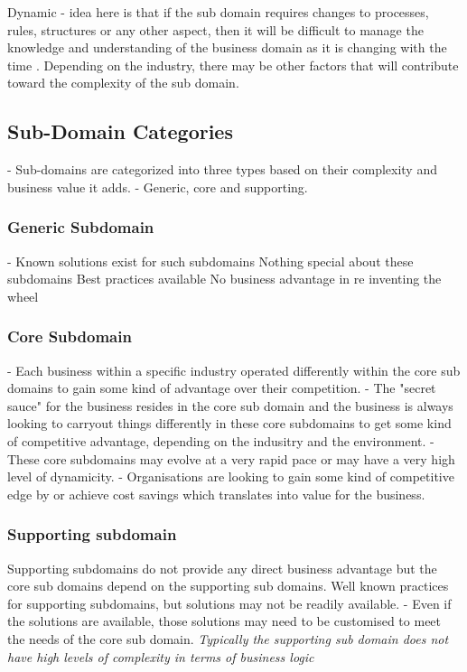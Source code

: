 Dynamic - idea here is that if the sub domain requires changes to processes, rules, structures or any other aspect, then it will be difficult to manage the knowledge and understanding of the business domain as it is changing with the time .
Depending on the industry, there may be other factors that will contribute toward the complexity of the sub domain.

\subsection{Sub-Domain Categories}
- Sub-domains are categorized into three types based on their complexity and business value it adds.
- Generic, core and supporting.

\subsubsection{Generic Subdomain}
- Known solutions exist for such subdomains
Nothing special about these subdomains
Best practices available
No business advantage in re inventing the wheel

\subsubsection{Core Subdomain}
- Each business within a specific industry operated differently within the core sub domains to gain some kind of advantage over their competition.
- The "secret sauce" for the business resides in the core sub domain and the business is always looking to carryout things differently in these core subdomains to get some kind of competitive advantage, depending on the indusitry and the environment.
- These core subdomains may evolve at a very rapid pace or may have a very high level of dynamicity.
- Organisations are looking to gain some kind of competitive edge by or achieve cost savings which translates into value for the business.

\subsubsection{Supporting subdomain}
Supporting subdomains do not provide any direct business advantage but the core sub domains depend on the supporting sub domains.
Well known practices for supporting subdomains, but solutions may not be readily available.
- Even if the solutions are available, those solutions may need to be customised to meet the needs of the core sub domain.
\textit{Typically the supporting sub domain does not have high levels of complexity in terms of business logic}

